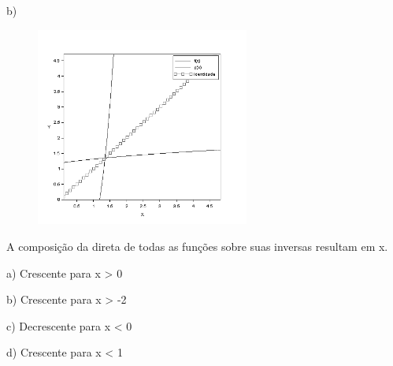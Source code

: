 \begin{respostas}{6}
    b)

    \begin{figure}[H]
	    \begin{Center}
		    \includegraphics[width=2.76in,height=2.57in]{capitulos/logaritmos_e_funcao_logaritmica/media/image18.png}
	    \end{Center}
    \end{figure}

    \ansitem{} A composição da direta de todas as funções sobre suas inversas resultam em x.

    \ansitem{} a) Crescente para x > 0

    \ansitem{} b) Crescente para x > -2

    \ansitem{} c) Decrescente para x < 0

    \ansitem{} d) Crescente para x < 1

\end{respostas}

